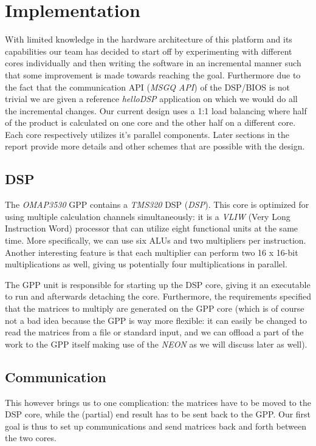 \section{Implementation}
With limited knowledge in the hardware architecture of this platform and its capabilities our team has decided to start off by experimenting with different cores individually and then writing the software in an incremental manner such that some improvement is made towards reaching the goal. Furthermore due to the fact that the communication API (\emph{MSGQ API}) of the DSP/BIOS is not trivial we are given a reference \emph{helloDSP} application on which we would do all the incremental changes.
Our current design uses a 1:1 load balancing where half of the product is calculated on one core and the other half on a different core. Each core respectively utilizes it's parallel components. Later sections in the report provide more details and other schemes that are possible with the design.

\subsection{DSP}
The \emph{OMAP3530} GPP contains a \emph{TMS320} DSP (\emph{DSP})\cite{gpp-refman}. This
core is optimized for using multiple calculation channels simultaneously: it is
a \emph{VLIW} (Very Long Instruction Word) processor that can utilize eight
functional units at the same time. More specifically, we can use six ALUs and
two multipliers per instruction. Another interesting feature is that each
multiplier can perform two 16 x 16-bit multiplications as well\cite{dsp-refman}, giving us
potentially four multiplications in parallel.

The GPP unit is responsible for starting up the DSP core, giving it an executable to run
and afterwards detaching the core. Furthermore, the requirements specified
that the matrices to multiply are generated on the GPP core (which is
of course not a bad idea because the GPP is way more flexible: it can easily
be changed to read the matrices from a file or standard input, and we can
offload a part of the work to the GPP itself making use of the \emph{NEON} as we
will discuss later as well).

\subsection{Communication}
This however brings us to one complication: the matrices have to be moved to
the DSP core, while the (partial) end result has to be sent back to the GPP.
Our first goal is thus to set up communications and send matrices back and forth
between the two cores.

